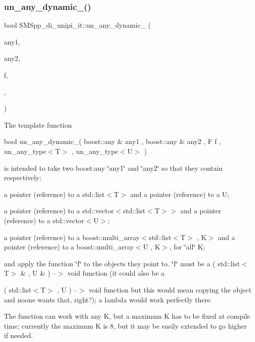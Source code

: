 \subsubsection{\texorpdfstring{un\+\_\+any\+\_\+dynamic\+\_()}{un\_any\_dynamic\_2()}}
{\footnotesize\ttfamily bool S\+M\+Spp\+\_\+di\+\_\+unipi\+\_\+it\+::un\+\_\+any\+\_\+dynamic\+\_ (\begin{DoxyParamCaption}\item[{const boost\+::any \&}]{any1,  }\item[{const boost\+::any \&}]{any2,  }\item[{F}]{f,  }\item[{\mbox{\hyperlink{struct_s_m_spp__di__unipi__it_1_1un__any__type}{un\+\_\+any\+\_\+type}}$<$ T $>$}]{,  }\item[{\mbox{\hyperlink{struct_s_m_spp__di__unipi__it_1_1un__any__type}{un\+\_\+any\+\_\+type}}$<$ U $>$}]{ }\end{DoxyParamCaption})}

The template function

bool un\+\_\+any\+\_\+dynamic\+\_( boost\+::any \& any1 , boost\+::any \& any2 , F f , un\+\_\+any\+\_\+type$<$\+T$>$ , un\+\_\+any\+\_\+type$<$\+U$>$ )

is intended to take two boost\+:any \char`\"{}any1\char`\"{} and \char`\"{}any2\char`\"{} so that they contain respectively\+:


\begin{DoxyItemize}
\item a pointer (reference) to a std\+::list$<$\+T$>$ and a pointer (reference) to a U;
\item a pointer (reference) to a std\+::vector$<$std\+::list$<$\+T$>$$>$ and a pointer (reference) to a std\+::vector$<$\+U$>$;
\item a pointer (reference) to a boost\+::multi\+\_\+array$<$std\+::list$<$\+T$>$ , K$>$ and a pointer (reference) to a boost\+::multi\+\_\+array$<$\+U , K$>$, for \char`\"{}all\char`\"{} K;
\end{DoxyItemize}

and apply the function \char`\"{}f\char`\"{} to the objects they point to. \char`\"{}f\char`\"{} must be a ( std\+::list$<$\+T$>$ \& , U \& ) --$>$ void function (it could also be a

( std\+::list$<$\+T$>$ , U ) --$>$ void function but this would mean copying the object and noone wants that, right?); a lambda would work perfectly there.

The function can work with any K, but a maximum K has to be fixed at compile time; currently the maximum K is 8, but it may be easily extended to go higher if needed.

